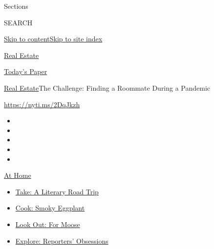 Sections

SEARCH

\protect\hyperlink{site-content}{Skip to
content}\protect\hyperlink{site-index}{Skip to site index}

\href{https://www.nytimes3xbfgragh.onion/section/realestate}{Real
Estate}

\href{https://myaccount.nytimes3xbfgragh.onion/auth/login?response_type=cookie\&client_id=vi}{}

\href{https://www.nytimes3xbfgragh.onion/section/todayspaper}{Today's
Paper}

\href{/section/realestate}{Real Estate}\textbar{}The Challenge: Finding
a Roommate During a Pandemic

\url{https://nyti.ms/2DqJkzh}

\begin{itemize}
\item
\item
\item
\item
\item
\end{itemize}

\href{https://www.nytimes3xbfgragh.onion/spotlight/at-home?action=click\&pgtype=Article\&state=default\&region=TOP_BANNER\&context=at_home_menu}{At
Home}

\begin{itemize}
\tightlist
\item
  \href{https://www.nytimes3xbfgragh.onion/2020/07/28/books/time-for-a-literary-road-trip.html?action=click\&pgtype=Article\&state=default\&region=TOP_BANNER\&context=at_home_menu}{Take:
  A Literary Road Trip}
\item
  \href{https://www.nytimes3xbfgragh.onion/2020/07/29/magazine/bored-with-your-home-cooking-some-smoky-eggplant-will-fix-that.html?action=click\&pgtype=Article\&state=default\&region=TOP_BANNER\&context=at_home_menu}{Cook:
  Smoky Eggplant}
\item
  \href{https://www.nytimes3xbfgragh.onion/2020/07/27/travel/moose-michigan-isle-royale.html?action=click\&pgtype=Article\&state=default\&region=TOP_BANNER\&context=at_home_menu}{Look
  Out: For Moose}
\item
  \href{https://www.nytimes3xbfgragh.onion/interactive/2020/at-home/even-more-reporters-editors-diaries-lists-recommendations.html?action=click\&pgtype=Article\&state=default\&region=TOP_BANNER\&context=at_home_menu}{Explore:
  Reporters' Obsessions}
\end{itemize}

